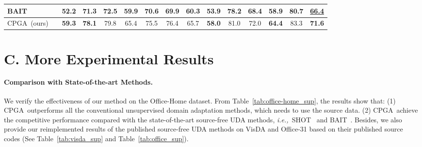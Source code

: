 \documentclass{article}
\def\ie{\emph{i.e.,~}}
\def\ournet{CPGA}
\newcommand{\cmark}{\ding{51}}\newcommand{\xmark}{\ding{55}}\renewcommand{\algorithmicrequire}{\textbf{Require:}}
\begin{document}
\begin{table*}[!h]
\begin{center}
{\begin{tabular}{lcccccccccccccc}
         BAIT~\cite{Yang2020UnsupervisedDA} & \cmark & 52.2 & 71.3 & 72.5 & 59.9 & 70.6 & 69.9 & 60.3 & 53.9 & 78.2 & 68.4 & 58.9 & 80.7 & \underline{66.4} \\
         \midrule
         \ournet~(ours) & \cmark & \textbf{59.3} & \textbf{78.1} & 79.8 & 65.4 & 75.5 & 76.4 & 65.7 & \textbf{58.0} & 81.0 & 72.0 & \textbf{64.4} & 83.3 & \textbf{71.6} \\
         \bottomrule
         \end{tabular}}
    \end{center}
    \caption{\label{tab:office-home_sup}. Classification accuracies (\%) on the Office-Home dataset (ResNet-50). We adopt underline to denote reimplemented results.}
\end{table*}

\section*{C. More Experimental Results} \label{sec:exp}

\paragraph{Comparison with State-of-the-art Methods.}

We verify the effectiveness of our method on the Office-Home dataset. From Table~\ref{tab:office-home_sup}, the results show that: (1) \ournet~outperforms all the conventional unsupervised domain adaptation methods, which needs to use the source data. (2) \ournet~achieve the competitive performance compared with the state-of-the-art source-free UDA methods, \ie SHOT~\cite{liang2020shot} and BAIT~\cite{Yang2020UnsupervisedDA}. Besides, we also provide our reimplemented results of the published source-free UDA methods on VisDA and Office-31 based on their published source codes (See Table~\ref{tab:visda_sup} and Table~\ref{tab:office_sup}).
\end{document}
